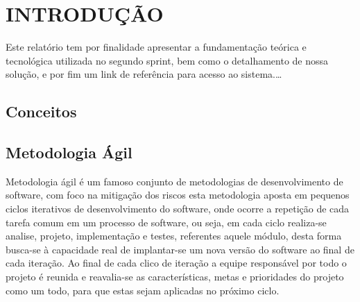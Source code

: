 \documentclass{abnt}
\begin{document}





\capa

\folhaderosto

\tableofcontents


\chapter{INTRODUÇÃO}

	Este relatório tem por finalidade apresentar a fundamentação teórica e tecnológica utilizada no segundo sprint, bem como o detalhamento de nossa solução, e por fim um link de referência para acesso ao sistema.\ldots


	\section{Conceitos}
	
	\section{Metodologia Ágil}
	
		Metodologia ágil é um famoso conjunto de metodologias de desenvolvimento de software, 
		com foco na mitigação dos riscos esta metodologia aposta em pequenos ciclos iterativos de desenvolvimento do software,
		onde ocorre a repetição de cada tarefa comum em um processo de software, ou seja, em cada ciclo realiza-se analise, projeto,
		implementação e testes, referentes aquele módulo, desta forma busca-se à capacidade real de implantar-se um nova versão 
		do software ao final de cada iteração. Ao final de cada clico de iteração a equipe responsável por todo o projeto é reunida 
		e reavalia-se as características, metas e prioridades do projeto como um todo, para que estas sejam aplicadas no próximo ciclo.
		
\end{document}
